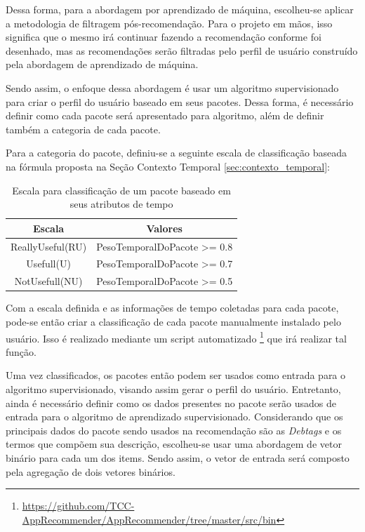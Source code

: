 Dessa forma, para a abordagem por aprendizado de máquina, escolheu-se aplicar a
metodologia de filtragem pós-recomendação. Para o projeto em mãos, isso
significa que o mesmo irá continuar fazendo a recomendação conforme foi
desenhado, mas as recomendações serão filtradas pelo perfil de usuário
construído pela abordagem de aprendizado de máquina.

Sendo assim, o enfoque dessa abordagem é usar um algoritmo supervisionado
para criar o perfil do usuário baseado em seus pacotes. Dessa forma, é
necessário definir como cada pacote será apresentado para algoritmo, além de
definir também a categoria de cada pacote.

Para a categoria do pacote, definiu-se a seguinte escala de classificação baseada na
fórmula proposta na Seção Contexto Temporal \ref{sec:contexto_temporal}:

\begin{table}[h]
\centering
\begin{tabular}{cc}
\hline
\rowcolor[HTML]{EFEFEF}
{Escala} & {Valores} \\ \hline
{ReallyUseful(RU)}  & PesoTemporalDoPacote >= 0.8                  \\ \hline
{Usefull(U)}   & PesoTemporalDoPacote >= 0.7                  \\ \hline
{NotUsefull(NU)}   & PesoTemporalDoPacote >= 0.5                  \\ \hline
\end{tabular}
\caption{Escala para classificação de um pacote baseado em seus atributos de tempo}
\label{tab:classificacao_pacotes}
\end{table}


Com a escala definida e as informações de tempo coletadas para cada pacote,
pode-se então criar a classificação de cada pacote manualmente instalado pelo
usuário.
Isso é realizado mediante um script automatizado \footnote{\url{https://github.com/TCC-AppRecommender/AppRecommender/tree/master/src/bin}}
que irá realizar tal função.

Uma vez classificados, os pacotes então podem ser usados como entrada para o
algoritmo supervisionado, visando assim gerar o perfil do usuário.
Entretanto, ainda é necessário definir como os dados presentes no pacote serão usados de entrada para o
algoritmo de aprendizado supervisionado. Considerando que os principais dados do pacote sendo usados na
recomendação são as \textit{Debtags} e os termos que compõem sua descrição, escolheu-se usar uma abordagem de
vetor binário para cada um dos items. Sendo assim, o vetor de entrada será composto pela agregação de dois vetores
binários.


